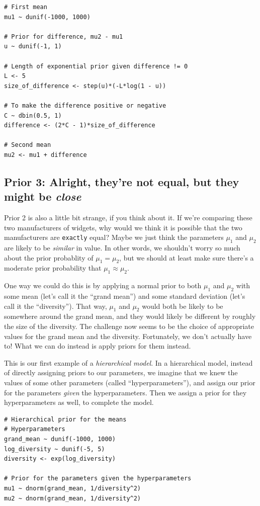 \begin{verbatim}
# First mean
mu1 ~ dunif(-1000, 1000)

# Prior for difference, mu2 - mu1
u ~ dunif(-1, 1)

# Length of exponential prior given difference != 0
L <- 5
size_of_difference <- step(u)*(-L*log(1 - u))

# To make the difference positive or negative
C ~ dbin(0.5, 1)
difference <- (2*C - 1)*size_of_difference

# Second mean
mu2 <- mu1 + difference
\end{verbatim}

\subsection{Prior 3: Alright, they're not equal, but they might be {\it close}}
Prior 2 is also a little bit strange, if you think about it. If we're comparing
these two manufacturers of widgets, why would we think it is possible that the
two manufacturers are {\tt exactly} equal? Maybe we just think the parameters
$\mu_1$ and $\mu_2$ are likely to be {\it similar} in value.
In other words, we shouldn't worry so much about the
prior probablity of $\mu_1 = \mu_2$, but we should at least make sure there's
a moderate prior probability that $\mu_1 \approx \mu_2$.

One way we could do this is by applying a normal prior to both $\mu_1$ and
$\mu_2$ with some mean (let's call it the ``grand mean'')
and some standard deviation (let's call it the ``diversity'').
That way, $\mu_1$ and
$\mu_2$ would both be likely to be somewhere around the grand mean, and
they would likely be different by roughly the size of the diversity.
The challenge now seems to be the choice of appropriate values for the grand
mean and the diversity. Fortunately, we don't actually have to! What we can
do instead is apply priors for them instead.

This is our first example of a {\it hierarchical model}. In a hierarchical
model, instead of directly assigning priors to our parameters, we imagine that
we knew the values of some other parameters (called ``hyperparameters''), and
assign our prior for the parameters {\it given} the hyperparameters. Then we
assign a prior for they hyperparameters as well, to complete the model.

\begin{verbatim}
# Hierarchical prior for the means
# Hyperparameters
grand_mean ~ dunif(-1000, 1000)
log_diversity ~ dunif(-5, 5)
diversity <- exp(log_diversity)

# Prior for the parameters given the hyperparameters
mu1 ~ dnorm(grand_mean, 1/diversity^2)
mu2 ~ dnorm(grand_mean, 1/diversity^2)
\end{verbatim}

